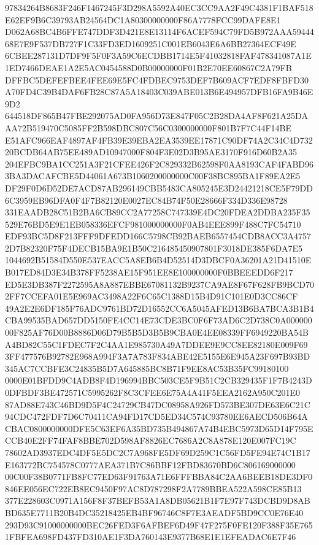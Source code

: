 \documentclass[UTF8,fontset=fandol,zihao=-4,a4paper]{ctexart}
\begin{document}
{{97834264B8683F246F1467245F3D298A5592A40EC3CC9AA2F49C4381F1BAF518E62EF9B6C39793AB24564DC1A80300000000F86A7778FCC99DAFE8E1
D062A68BC4B6FFE747DDF3D421E8E13114F6ACEF594C79FD5B972AAA5944468E7E9F537DB727F1C33FD3ED1609251C001EB6043E6A6BB27364ECF49E
6CBEE287131D7DF9F5F0F3A59C6ECDBB1714E5F41032818FAF478341087A1E1ED7466DEAE1A2E5AC0454588D0B00000000F01B2E70EE60867C2A79FB
DFFBC5DEFEFBEE4FEE69E5FC4FDBEC9753DEF7B609ACF7EDF8FBFD30A70FD4C39B4DAF6FB28C87A5A18403C039ABE013B6E494957DFB16FA9B46E9D2
644518DF865B47FBE292075AD0FA956D73E847F05C2B28DA4AF8F621A25DAAA72B519470C5085FF2B598DBC807C56C0300000000F801B7F7C44F14BE
E51AFC966EAF4897AF4FB39E39EBA2EA3539EE17871C90DF74A2C34C4D73220BCDB64AB75EE489AD10947000F804F3E02D3B95AE3170F916D60B2A35
204EFBC9BA1CC251A3F21CFEE426F2C829332B62598F0AA8193CAF4FABD963BA3DACAFCBE5D44061A673B1060200000000C00F38BC895BA1F89EA2E5
DF29F0D6D52DE7ACD87AB296149CBB5483CA805245E3D24421218CE5F79DD6C3959EB96DFA0F4F7B82120E0027EC84B74F50E28666F334D336E98728
331EAADB28C51B2BA6CB89CC2A77258C747339E4DC20FDEA2DDBA235F35529E76BD5E9E1EB058336EFCF981000000000F0AB4EEE899F488C7FC54710
EDF93BC5D8F213FFF9DFEDD166C5798CB92BAEB6557454CDB8ACC3A47572D7B82320F75F4DECB15BA9E1B50C216485450907801F3018DE385F6DA7E5
1044692B51584D550E537EACC5A8EB6B4D52514D3DBCF0A36201A21D41510EB017ED84D3E34B378FF5238AE15F951EE8E100000000F0BBEEEDD6F217
ED5E3DB387F2272595A8A887EBBE67081132B9237CA9AE8F67F628FB9BCD702FF7CCEFA01E5E969AC3498A22F6C65C1388D15B4D91C101E0D3CC86CF
49A2E2E6DF185F76ADC9761BD72D16552CC6A5045AFED13B6BA7BCA3B1B4CBA99535BAD657DD5150FE4CC14E73CDE3BC0F6F73AD6C2D738C0A000000
00F825AF76D00B8886D06D79B5B5D3B5B9CBA0E4EE08339FF6949220BA54BA4BD82C55C1FDEC7F2C4AA1E985730A49A7DDEE9E9CC8EE82180E009F69
3FF477576B92782E968A994F3A7A783F834ABE42E5155E6E945A23F697B93BD345AC7CCBFE3C24835B5D7A645885BC8B71F9EE8AC53B35FC99180100
0000E01BFDD9C4ADB8F4D196994BBC503CE5F9B51C2CB329435F1F7B4243D0DFBDF3BE472571C5995262F8C3CFEE6E75A4A41F5EEA2162A950C201E0
87AD88E743C46BD9D5F4C24729CB47DC08958A926FD573BE307DE63E6C21C94CDC472FDF7D6C70411CA94FD17CD5ED34C574C93780EE6AECD506B64A
CBAC0800000000DFE5C63EF6A35BD735B494867A74B4EBC5973D65D14F795ECCB40E2FF74FAF8BBE702D598AF8826EC7686A2C8A878E120E007FC19C
78602AD3937EDC4DF5E5DC2C7A968FE5DF69D259C1C56FD5FE94E74C1B17E163772BC754578C0777AEA371B7C86BBF12FBD83670BD6C806169000000
00C00F38B0771FB8FC77ED63F91763A71E6FFFBBA84C2AA6BEEB18DE3DF0846EE056EC722EB8EC9450F97AC8D787298F2A7789BBEA522A598CE85B13
377E228603C0971A156F8F37BEFB53A1A8DB05621B1F7E97F743DCBD9D8ABBD635E7711B20B4DC35218425EB4BF96746C8F7E3AEADF5BD9CC0E76E40
293D93C91000000000BEC26FED3F6AFBEF6D49F47F275F0FE120F388F35E7651FBFEA698FD437FD310AE1F3DA760143E9377B68E1E1EFEADAC6E7F46
}}
\end{document}
